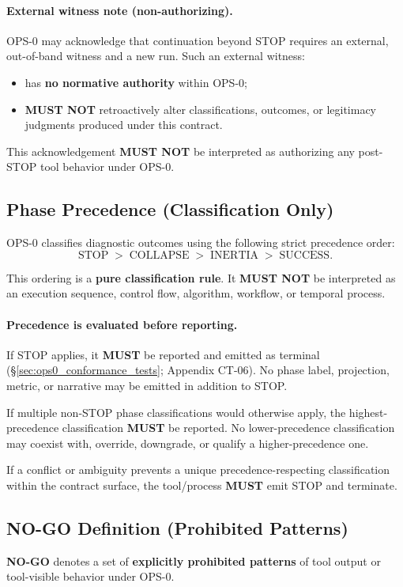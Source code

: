 \paragraph{External witness note (non-authorizing).}
OPS-0 may acknowledge that continuation beyond STOP requires an external,
out-of-band witness and a new run.
Such an external witness:
\begin{itemize}
  \item has \textbf{no normative authority} within OPS-0;
  \item \textbf{MUST NOT} retroactively alter classifications, outcomes,
        or legitimacy judgments produced under this contract.
\end{itemize}
This acknowledgement \textbf{MUST NOT} be interpreted as authorizing any
post-STOP tool behavior under OPS-0.

\subsection{Phase Precedence (Classification Only)}
OPS-0 classifies diagnostic outcomes using the following strict
precedence order:
\[
\text{STOP} \; > \; \text{COLLAPSE} \; > \; \text{INERTIA} \; > \; \text{SUCCESS}.
\]

This ordering is a \textbf{pure classification rule}.
It \textbf{MUST NOT} be interpreted as an execution sequence,
control flow, algorithm, workflow, or temporal process.

\paragraph{Precedence is evaluated before reporting.}
If STOP applies, it \textbf{MUST} be reported and emitted as terminal
(\S\ref{sec:ops0_conformance_tests}; Appendix CT-06).
No phase label, projection, metric, or narrative may be emitted
in addition to STOP.

If multiple non-STOP phase classifications would otherwise apply,
the highest-precedence classification \textbf{MUST} be reported.
No lower-precedence classification may coexist with,
override, downgrade, or qualify a higher-precedence one.

If a conflict or ambiguity prevents a unique precedence-respecting
classification within the contract surface, the tool/process \textbf{MUST}
emit STOP and terminate.

\subsection{NO-GO Definition (Prohibited Patterns)}
\textbf{NO-GO} denotes a set of \textbf{explicitly prohibited patterns}
of tool output or tool-visible behavior under OPS-0.

